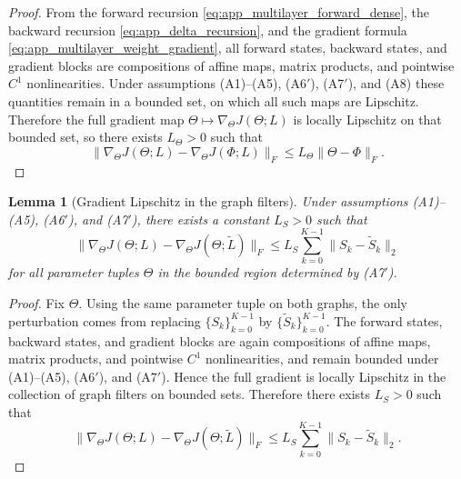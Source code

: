 \documentclass{article}
\newtheorem{lemma}{Lemma}
\begin{document}
\begin{proof}
From the forward recursion \eqref{eq:app_multilayer_forward_dense}, the backward recursion \eqref{eq:app_delta_recursion}, and the gradient formula \eqref{eq:app_multilayer_weight_gradient}, all forward states, backward states, and gradient blocks are compositions of affine maps, matrix products, and pointwise $C^1$ nonlinearities. Under assumptions (A1)--(A5), (A6$'$), (A7$'$), and (A8) these quantities remain in a bounded set, on which all such maps are Lipschitz. Therefore the full gradient map $\Theta\mapsto \nabla_\Theta J(\Theta;L)$ is locally Lipschitz on that bounded set, so there exists $L_\Theta>0$ such that
\[
\|\nabla_\Theta J(\Theta;L)-\nabla_\Theta J(\Phi;L)\|_F
\le
L_\Theta \|\Theta-\Phi\|_F.
\]
\end{proof}

\begin{lemma}[Gradient Lipschitz in the graph filters]
\label{lem:multilayer_grad_lipschitz_filters}
Under assumptions (A1)--(A5), (A6$'$), and (A7$'$), there exists a constant $L_S>0$ such that
\[
\|\nabla_\Theta J(\Theta;L)-\nabla_\Theta J(\Theta;\widetilde L)\|_F
\le
L_S \sum_{k=0}^{K-1}\|S_k-\widetilde S_k\|_2
\]
for all parameter tuples $\Theta$ in the bounded region determined by (A7$'$).
\end{lemma}

\begin{proof}
Fix $\Theta$. Using the same parameter tuple on both graphs, the only perturbation comes from replacing $\{S_k\}_{k=0}^{K-1}$ by $\{\widetilde S_k\}_{k=0}^{K-1}$. The forward states, backward states, and gradient blocks are again compositions of affine maps, matrix products, and pointwise $C^1$ nonlinearities, and remain bounded under (A1)--(A5), (A6$'$), and (A7$'$). Hence the full gradient is locally Lipschitz in the collection of graph filters on bounded sets. Therefore there exists $L_S>0$ such that
\[
\|\nabla_\Theta J(\Theta;L)-\nabla_\Theta J(\Theta;\widetilde L)\|_F
\le
L_S \sum_{k=0}^{K-1}\|S_k-\widetilde S_k\|_2.
\]
\end{proof}
\end{document}
